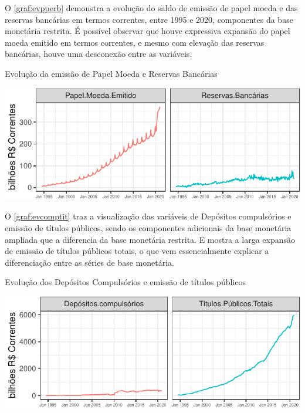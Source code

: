 \documentclass[
  12pt,
  12pt,
  openright,
  oneside,
  a4paper,
  chapter=TITLE,
  section=TITLE,
  subsection=TITLE,
  subsubsection=TITLE,
  english,
  portugues,
  sumario=tradicional]{abntex2}
\begin{document}
O \autoref{graf:evpperb} demonstra a evolução do saldo de emissão de papel moeda e das reservas bancárias em termos correntes, entre 1995 e 2020, componentes da base monetária restrita. É possível observar que houve expressiva expansão do papel moeda emitido em termos correntes, e mesmo com elevação das reservas bancárias, houve uma desconexão entre as variáveis.

\begin{grafico}[!htbp]
\vspace{20pt}
\caption{Evolução da emissão de Papel Moeda e Reservas Bancárias}
\vspace{-4mm}

\begin{center}\includegraphics{12-exportedfigures/base.moneybase.e-1} \end{center}
\vspace{-3mm}
\label{graf:evpperb}
\vspace{-2mm}
\end{grafico}

O \autoref{graf:evcomptit} traz a visualização das variáveis de Depósitos compulsórios e emissão de títulos públicos, sendo os componentes adicionais da base monetária ampliada que a diferencia da base monetária restrita. E mostra a larga expansão de emissão de títulos públicos totais, o que vem essencialmente explicar a diferenciação entre as séries de base monetária.

\begin{grafico}[!htbp]
\vspace{20pt}
\caption{Evolução dos Depósitos Compulsórios e emissão de títulos públicos}
\vspace{-4mm}

\begin{center}\includegraphics{12-exportedfigures/base.components-1} \end{center}
\vspace{-3mm}
\label{graf:evcomptit}
\vspace{-2mm}
\end{grafico}
\end{document}
